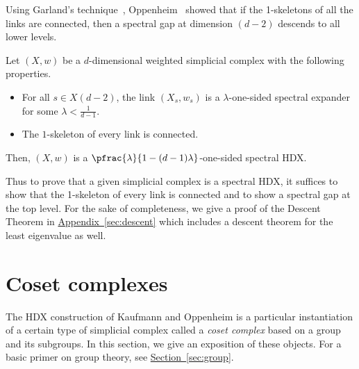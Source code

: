 \documentclass[11pt]{article}
\newcommand{\expref}[2]{\texorpdfstring{\hyperref[#2]{#1~\ref{#2}}}{#1~\ref{#2}}}
\begin{document}
Using Garland's technique~\cite{Garland1973}, Oppenheim~\cite{Oppenheim2018} 
showed that if the 1-skeletons of all the links are
connected, then a spectral gap at dimension $(d-2)$ descends to all
lower levels. 

%
\begin{dtheorem}[Oppenheim, 2018]\label{thm:trickle-down} %
%
%
%
Let $(X,w)$ be  %
a $d$-dimensional weighted simplicial complex with the following properties.
  \begin{itemize}
  \item For all $s \in X(d-2)$, the link $(X_s,w_s)$ is a
    $\lambda$-one-sided spectral expander for some $\lambda < \frac{1}{d-1}$. 
  \item The $1$-skeleton of every link is connected.
  \end{itemize}
  Then, $(X,w)$ is a $\pfrac{\lambda}{1 - (d-1)\lambda}$-one-sided spectral HDX.
\end{dtheorem}
Thus to prove that a given simplicial complex is a spectral HDX, it suffices to show that the 1-skeleton of %
every link is %
connected and %
to show   %
a spectral gap at the top level.
For the sake of completeness, we give a proof of the 
%
Descent Theorem  %
in
%
\expref{Appendix}{sec:descent}  %
which includes a descent theorem for the least eigenvalue as well.

\section{Coset complexes}

The HDX construction of Kaufmann and Oppenheim is a particular instantiation of a certain type of simplicial complex called a \emph{coset complex} based on a group and its subgroups. In this section, we give an exposition of these objects. 
For a basic primer on group theory,
see \expref{Section}{sec:group}.  %
%
\end{document}

